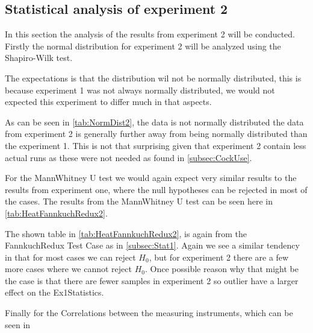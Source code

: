 \subsection{Statistical analysis of experiment 2}
In this section the analysis of the results from experiment 2 will be conducted. Firstly the normal distribution for experiment 2 will be analyzed using the Shapiro-Wilk test. 

The expectations is that the distribution wil not be normally distributed, this is because experiment 1 was not always normally distributed, we would not expected this experiment to differ much in that aspects. 

 

As can be seen in \cref{tab:NormDist2}, the data is not normally distributed the data from experiment 2 is generally further away from being normally distributed than the experiment 1. This is not that surprising given that experiment 2 contain less actual runs as these were not needed as found in \cref{subsec:CockUse}. 

For the MannWhitney U test we would again expect very similar results to the results from experiment one, where the null hypotheses can be rejected in most of the cases.
The results from the MannWhitney U test can be seen here in \cref{tab:HeatFannkuchRedux2}.

The shown table in \cref{tab:HeatFannkuchRedux2}, is again from the FannkuchRedux Test Case as in \cref{subsec:Stat1}. Again we see a similar tendency in that for most cases we can reject $H_0$, but for experiment 2 there are a few more cases where we cannot reject $H_0$. Once possible reason why that might be the case is that there are fewer samples in experiment 2 so outlier have a larger effect on the Ex1Statistics.

Finally for the Correlations between the measuring instruments, which can be seen in 



